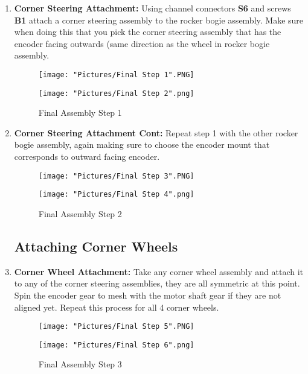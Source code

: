 \documentclass[12pt]{article}
\begin{document}
\begin{enumerate}
\item \textbf{Corner Steering Attachment: } Using channel connectors \textbf{S6} and screws \textbf{B1} attach a corner steering assembly to the rocker bogie assembly. Make sure when doing this that you pick the corner steering assembly that has the encoder facing outwards (same direction as the wheel in rocker bogie assembly.

\begin{figure}[H]
  \centering
  \begin{minipage}[b]{0.45\textwidth}
    \texttt{[image: "Pictures/Final Step 1".PNG]}
  \end{minipage}
  \hfill
  \begin{minipage}[b]{0.45\textwidth}
    \texttt{[image: "Pictures/Final Step 2".png]}
  \end{minipage}
  \caption{Final Assembly Step 1}
\end{figure}


\item \textbf{Corner Steering Attachment Cont: } Repeat step 1 with the other rocker bogie assembly, again making sure to choose the encoder mount that corresponds to outward facing encoder. 

\begin{figure}[H]
  \centering
  \begin{minipage}[b]{0.45\textwidth}
    \texttt{[image: "Pictures/Final Step 3".PNG]}
  \end{minipage}
  \hfill
  \begin{minipage}[b]{0.45\textwidth}
    \texttt{[image: "Pictures/Final Step 4".png]}
  \end{minipage}
  \caption{Final Assembly Step 2}
\end{figure}

\subsection{Attaching Corner Wheels}

\item \textbf{Corner Wheel Attachment: }Take any corner wheel assembly and attach it to any of the corner steering assemblies, they are all symmetric at this point. Spin the encoder gear to mesh with the motor shaft gear if they are not aligned yet. Repeat this process for all 4 corner wheels. 

\begin{figure}[H]
  \centering
  \begin{minipage}[b]{0.45\textwidth}
    \texttt{[image: "Pictures/Final Step 5".PNG]}
  \end{minipage}
  \hfill
  \begin{minipage}[b]{0.45\textwidth}
    \texttt{[image: "Pictures/Final Step 6".png]}
  \end{minipage}
  \caption{Final Assembly Step 3}
\end{figure}


\end{enumerate}
\end{document}
